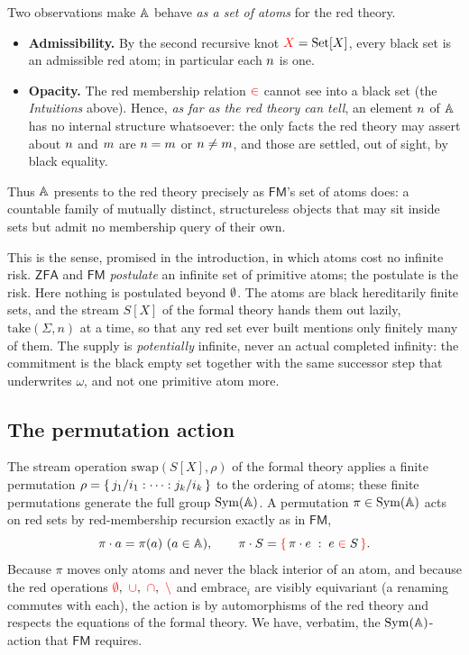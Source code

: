Two observations make $\mathbb{A}$ behave \emph{as a set of atoms} for the red
theory.
\begin{itemize}
\item \textbf{Admissibility.} By the second recursive knot $\textcolor{red}{X}=\textcolor{black}{\mathrm{Set}[X]}$, every
  black set is an admissible red atom; in particular each $\textcolor{black}{n}$ is one.
\item \textbf{Opacity.} The red membership relation $\mathrel{\textcolor{red}{\in}}$ cannot see into a
  black set (the \emph{Intuitions} above). Hence, \emph{as far as the red theory
  can tell}, an element $\textcolor{black}{n}$ of $\mathbb{A}$ has no internal structure
  whatsoever: the only facts the red theory may assert about $\textcolor{black}{n}$ and
  $\textcolor{black}{m}$ are $\textcolor{black}{n} = \textcolor{black}{m}$ or $\textcolor{black}{n} \neq \textcolor{black}{m}$, and those are settled,
  out of sight, by black equality.
\end{itemize}
Thus $\mathbb{A}$ presents to the red theory precisely as $\mathsf{FM}$'s set of
atoms does: a countable family of mutually distinct, structureless objects that
may sit inside sets but admit no membership query of their own.

\begin{remark}
\label{rem:risk}
This is the sense, promised in the introduction, in which atoms cost no infinite
risk. $\mathsf{ZFA}$ and $\mathsf{FM}$ \emph{postulate} an infinite set of
primitive atoms; the postulate is the risk. Here nothing is postulated beyond
$\textcolor{black}{\emptyset}$. The atoms are black hereditarily finite sets, and the stream $S[X]$ of
the formal theory hands them out lazily, $\mathrm{take}(\Sigma,n)$ at a time, so
that any red set ever built mentions only finitely many of them. The supply is
\emph{potentially} infinite, never an actual completed infinity: the commitment
is the black empty set together with the same successor step that underwrites
$\omega$, and not one primitive atom more.
\end{remark}

\subsection{The permutation action}
\label{sec:fmmodel:action}

The stream operation $\mathrm{swap}(S[X],\rho)$ of the formal theory applies a
finite permutation $\rho=\{\,\textcolor{black}{j_1}/\textcolor{black}{i_1}:\dots:\textcolor{black}{j_k}/\textcolor{black}{i_k}\,\}$ to
the ordering of atoms; these finite permutations generate the full group
$\mathrm{Sym}(\mathbb{A})$. A permutation $\pi\in\mathrm{Sym}(\mathbb{A})$ acts on red sets by
red-membership recursion exactly as in $\mathsf{FM}$,
\[
  \pi\cdot a = \pi(a)\ (a\in\mathbb{A}),
  \qquad
  \pi\cdot S = \textcolor{red}{\{}\, \pi\cdot e \;:\; e \mathrel{\textcolor{red}{\in}} S \,\textcolor{red}{\}}.
\]
Because $\pi$ moves only atoms and never the black interior of an atom, and
because the red operations $\remp,\ \rcup,\ \rcap,\ \rsm$ and
$\mathrm{embrace}_i$ are visibly equivariant (a renaming commutes with each), the
action is by automorphisms of the red theory and respects the equations of the
formal theory. We have, verbatim, the $\mathrm{Sym}(\mathbb{A})$-action that $\mathsf{FM}$
requires.

